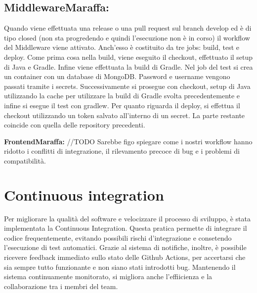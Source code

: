 \subsection{MiddlewareMaraffa:} 
Quando viene effettuata una release o una pull request sul branch develop ed è di tipo closed
(non sta progredendo e quindi l’esecuzione non è in corso) il workflow del Middleware viene attivato.
Anch'esso è costituito da tre jobs: build, test e deploy.
Come prima cosa nella build, viene eseguito il checkout, effettuato il setup di Java e Gradle. Infine viene effettuata la 
build di Gradle.
Nel job del test si crea un container con un database di MongoDB. Password e username vengono passati tramite i secrets. Successivamente
si prosegue con checkout, setup di Java utilizzando la cache per utilizzare la build di Gradle svolta precedentemente e 
infine si esegue il test con gradlew.
Per quanto riguarda il deploy, si effettua il checkout utilizzando un token salvato all'interno di un secret. La parte
restante coincide con quella delle repository precedenti.




\item \textbf{FrontendMaraffa:} //TODO
Sarebbe figo spiegare come i nostri workflow hanno ridotto i conflitti di integrazione, il rilevamento precoce di bug e i problemi di compatibilità.


\section{Continuous integration}
Per migliorare la qualità del software e velocizzare il processo di sviluppo, è stata implementata la Continuous Integration.
Questa pratica permette di integrare il codice frequentemente, evitando possibili rischi d'integrazione e consetendo 
l'esecuzione di test automatici. Grazie al sistema di notifiche, inoltre, è possibile ricevere feedback immediato sullo stato delle Github Actions,
per accertarsi che sia sempre tutto funzionante e non siano stati introdotti bug. Mantenendo il sistema continuamente monitorato,
si migliora anche l'effiicienza e la collaborazione tra i membri del team.



